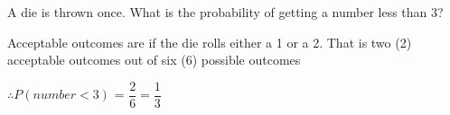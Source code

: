 

\question[1]  A die is thrown once. What is the probability of getting a number less than 3?

\ifprintanswers
\fi 

\begin{solution}[\mcq]
	Acceptable outcomes are if the die rolls either a 1 or a 2. That is two (2) acceptable 
	outcomes out of six (6) possible outcomes
	
	$\therefore P( number < 3 )$ = $\dfrac{2}{6} = \dfrac{1}{3}$
\end{solution}
\ifprintanswers\begin{codex}\end{codex}\fi
